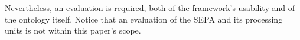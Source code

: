 Nevertheless, an evaluation is required, both of the framework's usability and of the ontology itself. Notice that an evaluation of the SEPA and its processing units is not within this paper's scope.




